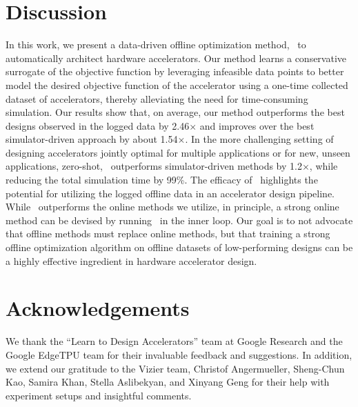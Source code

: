 \section{Discussion}
\label{sec:discussion}
\vspace{-0.1cm}
%
In this work, we present a data-driven offline optimization method, \primemethodname\ to automatically architect hardware accelerators. Our method learns a conservative surrogate of the objective function by leveraging  infeasible data points to better model the desired objective function of the accelerator using a one-time collected dataset of accelerators, thereby alleviating the need for time-consuming simulation.
%
Our results show that, on average, our method outperforms the best designs observed in the logged data by 2.46$\times$ and improves over the best simulator-driven approach by about 1.54$\times$. 
%
In the more challenging setting of designing accelerators jointly optimal for multiple applications or for new, unseen applications, zero-shot, \primemethodname\ outperforms simulator-driven methods by 1.2$\times$, while reducing the total simulation time by 99\%.
%
{The efficacy of \primemethodname\ highlights the potential for utilizing the logged offline data in an accelerator design pipeline. While \primemethodname\ outperforms the online methods we utilize, in principle, a strong online method can be devised by running \primemethodname\ in the inner loop. Our goal is to not advocate that offline methods must replace online methods, but that training a strong offline optimization algorithm on offline datasets of low-performing designs can be a highly effective ingredient in hardware accelerator design.}


\section*{Acknowledgements}
%
We thank the ``Learn to Design Accelerators'' team at Google Research and the Google EdgeTPU team for their invaluable feedback and suggestions.
%
In addition, we extend our gratitude to the Vizier team, Christof Angermueller, Sheng-Chun Kao, Samira Khan, Stella Aslibekyan, and Xinyang Geng for their help with experiment setups and insightful comments. 